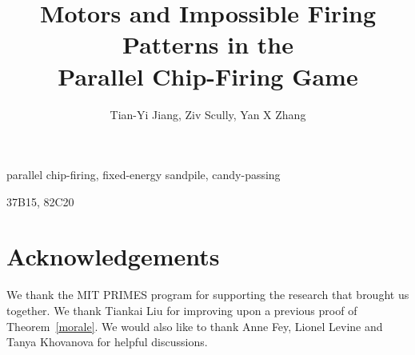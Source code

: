 \documentclass{siamltex}
\newlength{\figWidthA}
\newlength{\figWidthB}
\numberwithin{equation}{section}
\begin{document}
\setlength{}
\setlength{}

\renewcommand{\thefootnote}{\fnsymbol{footnote}}
\title{Motors and Impossible
  Firing Patterns in the\\Parallel Chip-Firing Game}
\author{Tian-Yi Jiang\footnotemark[1], Ziv Scully\footnotemark[1], Yan X
  Zhang\footnotemark[1] \footnotemark[2]}
\renewcommand{\thefootnote}{\arabic{footnote}}

\pagestyle{myheadings}
\thispagestyle{plain}
\begin{abstract}

\end{abstract}
\begin{keywords}
parallel chip-firing, fixed-energy sandpile, candy-passing
\end{keywords}
\begin{AMS}
37B15, 82C20
\end{AMS}

\maketitle

















\section*{Acknowledgements}
We thank the MIT PRIMES program for supporting the research that brought us
together. We thank Tiankai Liu for improving upon a previous proof of
Theorem~\ref{morale}. We would also like to thank Anne Fey, Lionel Levine and
Tanya Khovanova for helpful discussions.



\end{document}
